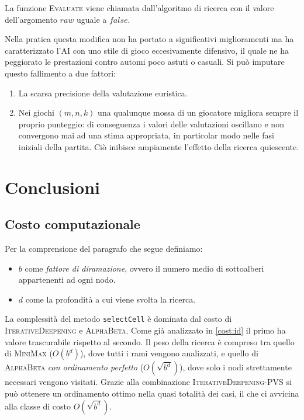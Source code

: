 \documentclass{article}
\begin{document}
La funzione \textsc{Evaluate} viene chiamata dall'algoritmo di ricerca con il valore
dell'argomento $raw$ uguale a $false$.

Nella pratica questa modifica non ha portato a significativi miglioramenti
ma ha caratterizzato l'AI con uno stile di gioco eccesivamente difensivo, il
quale ne ha peggiorato le prestazioni contro automi poco astuti o casuali.
Si pu\`o imputare questo fallimento a due fattori:
\begin{enumerate}
  \item La scarsa precisione della valutazione euristica.
  \item Nei giochi $(m, n, k)$ una qualunque mossa di un giocatore migliora sempre
    il proprio punteggio: di conseguenza i valori delle valutazioni oscillano e
    non convergono mai ad una stima appropriata, in particolar modo nelle fasi
    iniziali della partita. Ci\`o inibisce ampiamente l'effetto della ricerca
    quiescente.
\end{enumerate}

\section{Conclusioni}

\subsection{Costo computazionale}

Per la comprensione del paragrafo che segue definiamo:
\begin{itemize}
  \item $b$ come \emph{fattore di diramazione}, ovvero il numero medio di
    sottoalberi appartenenti ad ogni nodo.
  \item $d$ come la profondit\`a a cui viene svolta la ricerca.
\end{itemize}

La complessit\`a del metodo \verb!selectCell! \`e dominata dal costo di
\textsc{IterativeDeepening} e \textsc{AlphaBeta}. Come gi\`a analizzato in \ref{cost:id}
il primo ha valore trascurabile rispetto al secondo. Il peso della ricerca \`e
compreso tra quello di \textsc{MiniMax} ($O(b^d)$), dove tutti i rami vengono
analizzati, e quello di \textsc{AlphaBeta} \emph{con ordinamento perfetto}
($O(\sqrt{b^d})$), dove solo i nodi strettamente necessari vengono visitati.
Grazie alla combinazione \textsc{IterativeDeepening}-\textsc{PVS} si pu\`o
ottenere un ordinamento ottimo nella quasi totalit\`a dei casi, il che ci avvicina
alla classe di costo $O(\sqrt{b^d})$.
\end{document}

